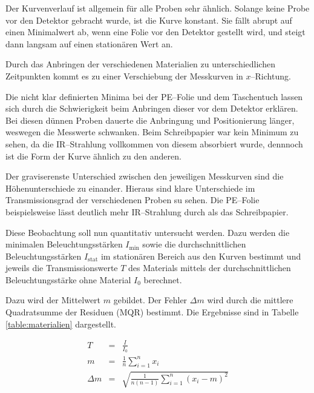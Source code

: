 \documentclass[12pt,a4paper]{scrartcl}
\numberwithin{equation}{section} %
\begin{document}
Der Kurvenverlauf ist allgemein für alle Proben sehr ähnlich. Solange keine Probe vor den Detektor gebracht wurde, ist die Kurve konstant. Sie fällt abrupt auf einen Minimalwert ab, wenn eine Folie vor den Detektor gestellt wird, und steigt dann langsam auf einen stationären Wert an.

Durch das Anbringen der verschiedenen Materialien zu unterschiedlichen Zeitpunkten kommt es zu einer Verschiebung der Messkurven in $x$--Richtung.

Die nicht klar definierten Minima bei der PE--Folie und dem Taschentuch lassen sich durch die Schwierigkeit beim Anbringen dieser vor dem Detektor erklären. Bei diesen dünnen Proben dauerte die Anbringung und Positionierung länger, weswegen die Messwerte schwanken. Beim Schreibpapier war kein Minimum zu sehen, da die IR--Strahlung vollkommen von diesem absorbiert wurde, dennnoch ist die Form der Kurve ähnlich zu den anderen.

Der graviserenste Unterschied zwischen den jeweiligen Messkurven sind die Höhenunterschiede zu einander. Hieraus sind klare Unterschiede im Transmissionsgrad der verschiedenen Proben su sehen. Die PE--Folie beispielsweise lässt deutlich mehr IR--Strahlung durch als das Schreibpapier.

Diese Beobachtung soll nun quantitativ untersucht werden. Dazu werden die minimalen Beleuchtungsstärken $I_\mathrm{min}$ sowie die durchschnittlichen Beleuchtungsstärken $I_\mathrm{stat}$ im stationären Bereich aus den Kurven bestimmt und jeweils die Transmissionswerte $T$ des Materials mittels der durchschnittlichen Beleuchtungsstärke ohne Material $I_0$ berechnet.

Dazu wird der Mittelwert $m$ gebildet. Der Fehler $\Delta m$ wird durch die mittlere Quadratsumme der Residuen (MQR) bestimmt. Die Ergebnisse sind in Tabelle \ref{table:materialien} dargestellt.

\begin{eqnarray}
	T &=& \frac{I}{I_0} \\
	m &=& \frac{1}{n} \sum_{i=1}^{n} x_i \\
	\Delta m &=& \sqrt{\frac{1}{n (n-1)} \sum_{i=1}^{n} (x_i - m)^2}
\end{eqnarray}
\end{document}
